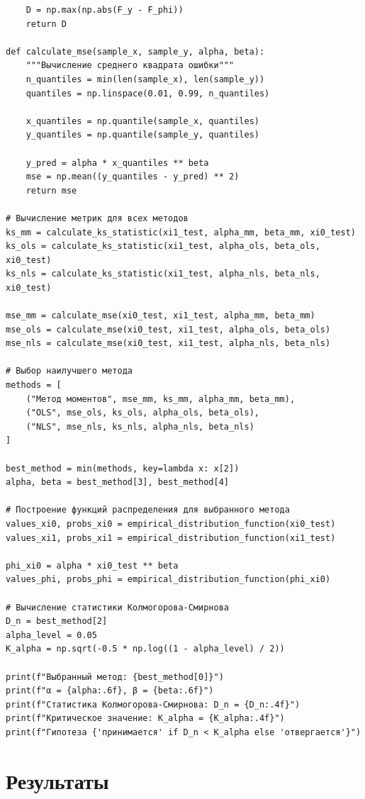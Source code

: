 \documentclass[a4paper, 14pt]{extarticle}
\begin{document}
\begin{longlisting}
\begin{verbatim}
    D = np.max(np.abs(F_y - F_phi))
    return D

def calculate_mse(sample_x, sample_y, alpha, beta):
    """Вычисление среднего квадрата ошибки"""
    n_quantiles = min(len(sample_x), len(sample_y))
    quantiles = np.linspace(0.01, 0.99, n_quantiles)
    
    x_quantiles = np.quantile(sample_x, quantiles)
    y_quantiles = np.quantile(sample_y, quantiles)
    
    y_pred = alpha * x_quantiles ** beta
    mse = np.mean((y_quantiles - y_pred) ** 2)
    return mse

# Вычисление метрик для всех методов
ks_mm = calculate_ks_statistic(xi1_test, alpha_mm, beta_mm, xi0_test)
ks_ols = calculate_ks_statistic(xi1_test, alpha_ols, beta_ols, xi0_test)
ks_nls = calculate_ks_statistic(xi1_test, alpha_nls, beta_nls, xi0_test)

mse_mm = calculate_mse(xi0_test, xi1_test, alpha_mm, beta_mm)
mse_ols = calculate_mse(xi0_test, xi1_test, alpha_ols, beta_ols)
mse_nls = calculate_mse(xi0_test, xi1_test, alpha_nls, beta_nls)

# Выбор наилучшего метода
methods = [
    ("Метод моментов", mse_mm, ks_mm, alpha_mm, beta_mm),
    ("OLS", mse_ols, ks_ols, alpha_ols, beta_ols),
    ("NLS", mse_nls, ks_nls, alpha_nls, beta_nls)
]

best_method = min(methods, key=lambda x: x[2])
alpha, beta = best_method[3], best_method[4]

# Построение функций распределения для выбранного метода
values_xi0, probs_xi0 = empirical_distribution_function(xi0_test)
values_xi1, probs_xi1 = empirical_distribution_function(xi1_test)

phi_xi0 = alpha * xi0_test ** beta
values_phi, probs_phi = empirical_distribution_function(phi_xi0)

# Вычисление статистики Колмогорова-Смирнова
D_n = best_method[2]
alpha_level = 0.05
K_alpha = np.sqrt(-0.5 * np.log((1 - alpha_level) / 2))

print(f"Выбранный метод: {best_method[0]}")
print(f"α = {alpha:.6f}, β = {beta:.6f}")
print(f"Статистика Колмогорова-Смирнова: D_n = {D_n:.4f}")
print(f"Критическое значение: K_alpha = {K_alpha:.4f}")
print(f"Гипотеза {'принимается' if D_n < K_alpha else 'отвергается'}")
\end{verbatim}
\end{longlisting}

\section{Результаты}
\end{document}

